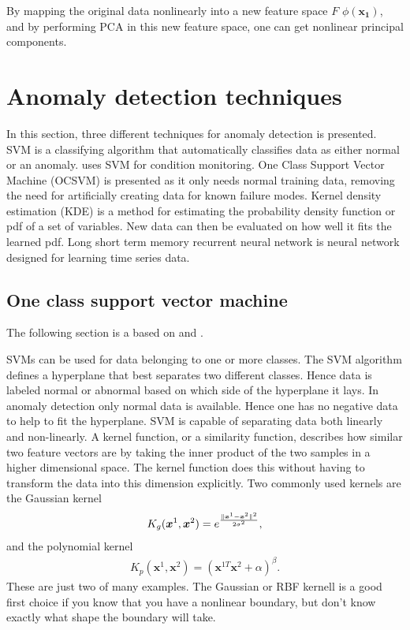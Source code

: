         By mapping the original data nonlinearly into a new feature space $F$ $\phi(\bm{x_1})$, and by performing PCA in this new feature space, one can get nonlinear principal components.


\section{Anomaly detection techniques}
    In this section, three different techniques for anomaly detection is presented. SVM is a classifying algorithm that automatically classifies data as either normal or an anomaly. \cite{Selak2014} uses SVM for condition monitoring. One Class Support Vector Machine (OCSVM) is presented as it only needs normal training data, removing the need for artificially creating data for known failure modes. Kernel density estimation (KDE) is a method for estimating the probability density function or pdf of a set of variables. New data can then be evaluated on how well it fits the learned pdf. Long short term memory recurrent neural network is neural network designed for learning time series data. 

    \subsection{One class support vector machine}\label{subsec:OCSVM}
    
            The following section is a based on \cite{Aasnes2017} and \cite{Hastie}. 
            
            SVMs can be used for data belonging to one or more classes. The SVM algorithm defines a hyperplane that best separates two different classes. Hence data is labeled normal or abnormal based on which side of the hyperplane it lays. In anomaly detection only normal data is available. Hence one has no negative data to help to fit the hyperplane. SVM is capable of separating data both linearly and non-linearly. A kernel function, or a similarity function, describes how similar two feature vectors are by taking the inner product of the two samples in a higher dimensional space. The kernel function does this without having to transform the data into this dimension explicitly. Two commonly used kernels are the Gaussian kernel
            \begin{align}
                K_g(\bm x^{1},\bm x^{2}) = e^{\frac{\lVert\bm x^{1}-\bm x^{2}\rVert^2}{2\sigma^2}}, 
                \label{svm:gauss}
            \end{align}
            and the polynomial kernel
            \begin{align}
                K_p(\bm x^{1},\bm x^{2}) = (\bm x^{1T}\bm x^{2} + \alpha)^\beta.
                \label{svm:poly}
            \end{align}
           These are just two of many examples. The Gaussian or RBF kernell is a good first choice if you know that you have a nonlinear boundary, but don't know exactly what shape the boundary will take.
    
